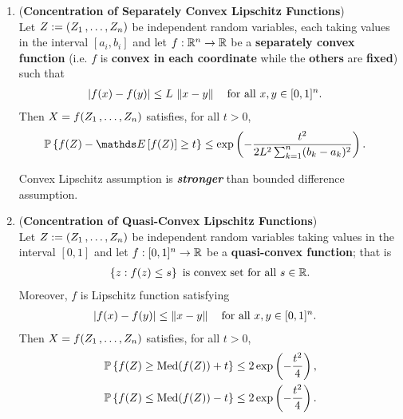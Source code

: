\documentclass[11pt]{article}
\begin{document}
\begin{itemize}
\begin{remark}
\begin{enumerate}
\item \begin{theorem} (\textbf{Concentration of Separately Convex Lipschitz Functions}) \citep{boucheron2013concentration}\\
Let  $Z:= (Z_1 \,{,}\ldots{,}\, Z_{n})$ be independent random variables, each taking values in the interval $[a_i, b_i]$ and let $f : {\mathbb R}^n \to {\mathbb R}$ be a \textbf{separately convex function} (i.e. $f$ is \textbf{convex in each coordinate} while the \textbf{others} are \textbf{fixed}) such that
\begin{align*}
\left\lvert f(x) - f(y) \right\rvert &\le L\,\left\|x - y\right\|_{} \quad \text{for all }x, y \in [0, 1]^n.
\end{align*}
Then $X = f(Z_1 \,{,}\ldots{,}\, Z_{n})$ satisfies, for all $t > 0$,
\begin{align*}
\bP\set{f(Z) - \E{}{f(Z)} \ge t } &\le \exp\paren{- \frac{t^2}{2L^2 \sum_{k=1}^{n}(b_k - a_k)^2}}. 
\end{align*}
\end{theorem} Convex Lipschitz assumption is \emph{\textbf{stronger}} than bounded difference assumption.

\item \begin{theorem} (\textbf{Concentration of Quasi-Convex Lipschitz Functions}) \citep{boucheron2013concentration}\\
Let  $Z:= (Z_1 \,{,}\ldots{,}\, Z_{n})$ be independent random variables taking values in the interval $[0, 1]$ and let $f : [0, 1]^n \to {\mathbb R}$ be a \textbf{quasi-convex function}; that is
\begin{align*}
\left\{z: f(z) \le s\right\} \text{ is convex set for all }s \in {\mathbb R}. 
\end{align*} Moreover, $f$ is Lipschitz function satisfying
\begin{align*}
\left\lvert f(x) - f(y) \right\rvert &\le \left\|x - y\right\|_{} \quad \text{for all }x, y \in [0, 1]^n.
\end{align*}
Then $X = f(Z_1 \,{,}\ldots{,}\, Z_{n})$ satisfies, for all $t > 0$,
\begin{align*}
{\mathbb P}\left\{f(Z)  \ge  \text{Med}(f(Z)) + t \right\} &\le 2\exp\left(- \frac{t^2}{4}\right), \\
{\mathbb P}\left\{f(Z)  \le \text{Med}(f(Z)) -t \right\} &\le 2\exp\left(- \frac{t^2}{4}\right). \nonumber
\end{align*}
\end{theorem}
\end{enumerate}
\end{remark}
\end{itemize}
\newpage
\end{document}
